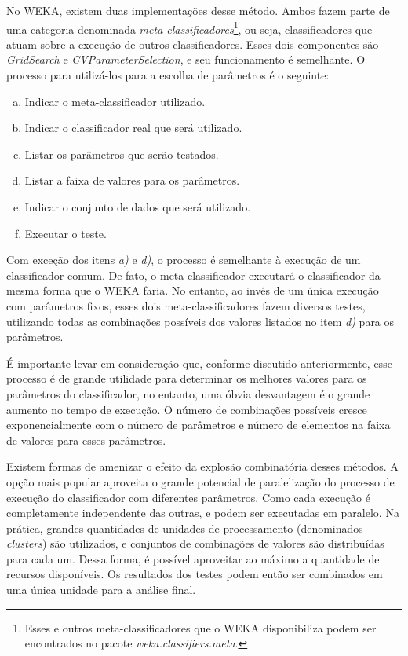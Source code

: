 No WEKA, existem duas implementações desse método. Ambos fazem parte de uma categoria denominada \emph{meta-classificadores}\footnote{Esses e outros meta-classificadores que o WEKA disponibiliza podem ser encontrados no pacote \emph{weka.classifiers.meta}.}, ou seja, classificadores que atuam sobre a execução de outros classificadores. Esses dois componentes são \emph{GridSearch} e \emph{CVParameterSelection}, e seu funcionamento é semelhante. O processo para utilizá-los para a escolha de parâmetros é o seguinte:

\begin{enumerate}[a)]
    \item Indicar o meta-classificador utilizado.
    \item Indicar o classificador real que será utilizado.
    \item Listar os parâmetros que serão testados.
    \item Listar a faixa de valores para os parâmetros.
    \item Indicar o conjunto de dados que será utilizado.
    \item Executar o teste.
\end{enumerate}

Com exceção dos itens \emph{a)} e \emph{d)}, o processo é semelhante à execução de um classificador comum. De fato, o meta-classificador executará o classificador da mesma forma que o WEKA faria. No entanto, ao invés de um única execução com parâmetros fixos, esses dois meta-classificadores fazem diversos testes, utilizando todas as combinações possíveis dos valores listados no item \emph{d)} para os parâmetros.

É importante levar em consideração que, conforme discutido anteriormente, esse processo é de grande utilidade para determinar os melhores valores para os parâmetros do classificador, no entanto, uma óbvia desvantagem é o grande aumento no tempo de execução. O número de combinações possíveis cresce exponencialmente com o número de parâmetros e número de elementos na faixa de valores para esses parâmetros.

Existem formas de amenizar o efeito da explosão combinatória desses métodos. A opção mais popular aproveita o grande potencial de paralelização do processo de execução do classificador com diferentes parâmetros. Como cada execução é completamente independente das outras, e podem ser executadas em paralelo. Na prática, grandes quantidades de unidades de processamento (denominados \emph{clusters}) são utilizados, e conjuntos de combinações de valores são distribuídas para cada um. Dessa forma, é possível aproveitar ao máximo a quantidade de recursos disponíveis. Os resultados dos testes podem então ser combinados em uma única unidade para a análise final.

